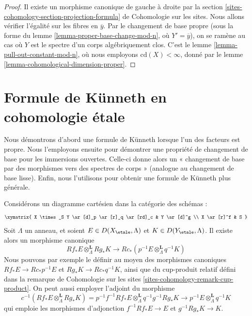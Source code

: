 \begin{proof}
Il existe un morphisme canonique de gauche à droite par la
section \ref{sites-cohomology-section-projection-formula} de Cohomologie sur les sites.
Nous allons vérifier l'égalité sur les fibres en $\overline{y}$.
Par le changement de base propre (sous la forme du
lemme \ref{lemma-proper-base-change-mod-n}, où $Y' = \overline{y}$),
on se ramène au cas où $Y$ est le spectre d'un
corps algébriquement clos.
C'est le lemme \ref{lemma-pull-out-constant-mod-n},
où nous employons $\text{cd}(X) < \infty$, donné par le
lemme \ref{lemma-cohomological-dimension-proper}.
\end{proof}






\section{Formule de K\"unneth en cohomologie étale}
\label{section-kunneth}

\noindent
Nous démontrons d'abord une formule de K\"unneth lorsque l'un des facteurs
est propre. Nous l'employons ensuite pour démontrer une propriété de changement de base
pour les immersions ouvertes. Celle-ci donne alors un
« changement de base par des morphismes vers des spectres de corps »
(analogue au changement de base lisse).
Enfin, nous l'utilisons pour obtenir une formule de K\"unneth plus générale.

\begin{remark}
\label{remark-define-kunneth-map}
Considérons un diagramme cartésien dans la catégorie des schémas :
$$
\xymatrix{
X \times_S Y \ar[d]_p \ar[r]_q \ar[rd]_c & Y \ar[d]^g \\
X \ar[r]^f & S
}
$$
Soit $\Lambda$ un anneau, et soient $E \in D(X_\etale, \Lambda)$
et $K \in D(Y_\etale, \Lambda)$. Il existe alors un morphisme canonique
$$
Rf_*E \otimes_\Lambda^\mathbf{L} Rg_*K
\longrightarrow
Rc_*(p^{-1}E \otimes_\Lambda^\mathbf{L} q^{-1}K)
$$
Nous pouvons par exemple le définir au moyen des morphismes canoniques
$Rf_*E \to Rc_*p^{-1}E$ et $Rg_*K \to Rc_*q^{-1}K$, ainsi que du
cup-produit relatif défini dans la remarque de Cohomologie sur les sites
\ref{sites-cohomology-remark-cup-product}.
On peut aussi employer l'adjoint du morphisme
$$
c^{-1}(Rf_*E \otimes_\Lambda^\mathbf{L} Rg_*K)
=
p^{-1}f^{-1}Rf_*E \otimes_\Lambda^\mathbf{L} q^{-1} g^{-1}Rg_*K
\to
p^{-1}E \otimes_\Lambda^\mathbf{L} q^{-1}K
$$
qui emploie les morphismes d'adjonction $f^{-1}Rf_*E \to E$ et
$g^{-1}Rg_*K \to K$.
\end{remark}


